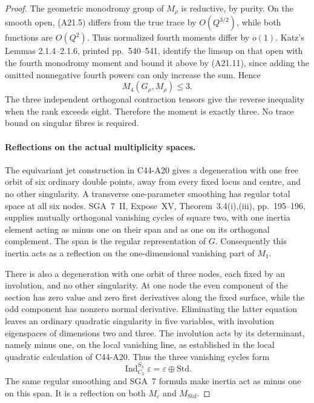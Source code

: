 \documentclass[11pt]{article}
\theoremstyle{remark}\newtheorem{remark}[theorem]{Remark}
\begin{document}
\begin{proof}
The geometric monodromy group of $M_\rho$ is reductive, by purity.
On the smooth open, (A21.5) differs from the true trace by $O(Q^{3/2})$,
while both functions are $O(Q^2)$.  Thus normalized fourth moments differ
by $o(1)$.  Katz's Lemmas 2.1.4--2.1.6, printed pp.~540--541, identify
the limsup on that open with the fourth monodromy moment and bound it
above by (A21.11), since adding the omitted nonnegative fourth powers
can only increase the sum.  Hence
\[
                  M_4(G_\rho,M_\rho)\leq3.                      \tag{A21.12}
\]
The three independent orthogonal contraction tensors give the reverse
inequality when the rank exceeds eight.  Therefore the moment is
exactly three.  No trace bound on singular fibres is required.

\paragraph{Reflections on the actual multiplicity spaces.}
The equivariant jet construction in C44-A20 gives a degeneration with
one free orbit of six ordinary double points, away from every fixed
locus and centre, and no other singularity.  A transverse one-parameter
smoothing has regular total space at all six nodes.  SGA~7~II,
Expose~XV, Theorem~3.4(i),(iii), pp.~195--196, supplies mutually
orthogonal vanishing cycles of square two, with one inertia element
acting as minus one on their span and as one on its orthogonal
complement.  The span is the regular representation of $G$.
Consequently this inertia acts as a reflection on the one-dimensional
vanishing part of $M_1$.

There is also a degeneration with one orbit of three nodes, each fixed
by an involution, and no other singularity.  At one node the even
component of the section has zero value and zero first derivatives
along the fixed surface, while the odd component has nonzero normal
derivative.  Eliminating the latter equation leaves an ordinary
quadratic singularity in five variables, with involution eigenspaces
of dimensions two and three.  The involution acts by its determinant,
namely minus one, on the local vanishing line, as established in the
local quadratic calculation of C44-A20.  Thus the three vanishing
cycles form
\[
                  \operatorname{Ind}_{C_2}^{S_3}\varepsilon
                          =\varepsilon\oplus\mathrm{Std}.       \tag{A21.13}
\]
The same regular smoothing and SGA~7 formula make inertia act as minus
one on this span.  It is a reflection on both $M_\varepsilon$ and
$M_{\mathrm{Std}}$.


\end{proof}
\end{document}
